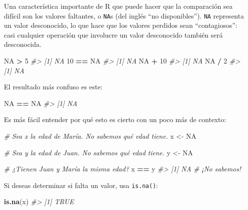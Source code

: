 \documentclass[11pt,oneside]{report}
\newenvironment{Shaded}{\begin{snugshade}}{\end{snugshade}}
\newcommand{\CommentTok}[1]{\textcolor[rgb]{0.56,0.35,0.01}{\textit{#1}}}
\newcommand{\DecValTok}[1]{\textcolor[rgb]{0.00,0.00,0.81}{#1}}
\newcommand{\KeywordTok}[1]{\textcolor[rgb]{0.13,0.29,0.53}{\textbf{#1}}}
\newcommand{\NormalTok}[1]{#1}
\newcommand{\OperatorTok}[1]{\textcolor[rgb]{0.81,0.36,0.00}{\textbf{#1}}}
\newcommand{\OtherTok}[1]{\textcolor[rgb]{0.56,0.35,0.01}{#1}}
\newcommand{\StringTok}[1]{\textcolor[rgb]{0.31,0.60,0.02}{#1}}
\begin{document}
Una característica importante de R que puede hacer que la comparación
sea difícil son los valores faltantes, o \texttt{NA}s (del inglés ``no
disponibles''). \texttt{NA} representa un valor desconocido, lo que hace
que los valores perdidos sean ``contagiosos'': casi cualquier operación
que involucre un valor desconocido también será desconocida.

\begin{Shaded}
\begin{Highlighting}[]
\OtherTok{NA} \OperatorTok{>}\StringTok{ }\DecValTok{5}
\CommentTok{#> [1] NA}
\DecValTok{10} \OperatorTok{==}\StringTok{ }\OtherTok{NA}
\CommentTok{#> [1] NA}
\OtherTok{NA} \OperatorTok{+}\StringTok{ }\DecValTok{10}
\CommentTok{#> [1] NA}
\OtherTok{NA} \OperatorTok{/}\StringTok{ }\DecValTok{2}
\CommentTok{#> [1] NA}
\end{Highlighting}
\end{Shaded}

El resultado más confuso es este:

\begin{Shaded}
\begin{Highlighting}[]
\OtherTok{NA} \OperatorTok{==}\StringTok{ }\OtherTok{NA}
\CommentTok{#> [1] NA}
\end{Highlighting}
\end{Shaded}

Es más fácil entender por qué esto es cierto con un poco más de
contexto:

\begin{Shaded}
\begin{Highlighting}[]
\CommentTok{# Sea x la edad de María. No sabemos qué edad tiene.}
\NormalTok{x <-}\StringTok{ }\OtherTok{NA}

\CommentTok{# Sea y la edad de Juan. No sabemos qué edad tiene.}
\NormalTok{y <-}\StringTok{ }\OtherTok{NA}

\CommentTok{# ¿Tienen Juan y María la misma edad?}
\NormalTok{x }\OperatorTok{==}\StringTok{ }\NormalTok{y}
\CommentTok{#> [1] NA}
\CommentTok{# ¡No sabemos!}
\end{Highlighting}
\end{Shaded}

Si deseas determinar si falta un valor, usa \texttt{is.na()}:

\begin{Shaded}
\begin{Highlighting}[]
\KeywordTok{is.na}\NormalTok{(x)}
\CommentTok{#> [1] TRUE}
\end{Highlighting}
\end{Shaded}
\end{document}
